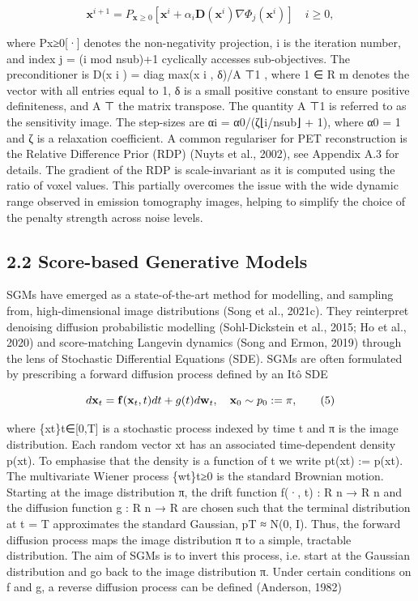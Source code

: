 \documentclass{article}
\begin{document}
$$\mathbf{x}^{i+1}=P_{\mathbf{x}\geq0}\left[\mathbf{x}^{i}+\alpha_{i}\mathbf{D}(\mathbf{x}^{i})\nabla\Phi_{j}(\mathbf{x}^{i})\right]\quad i\geq0,\tag{4}$$

where Px≥0[·] denotes the non-negativity projection, i is the iteration number, and index j = (i mod nsub)+1 cyclically accesses sub-objectives. The preconditioner is D(x i ) = diag max(x i , δ)/A ⊤1 , where 1 ∈ R m denotes the vector with all entries equal to 1, δ is a small positive constant to ensure positive definiteness, and A ⊤ the matrix transpose. The quantity A ⊤1 is referred to as the sensitivity image. The step-sizes are αi = α0/(ζ⌊i/nsub⌋ + 1), where α0 = 1 and ζ is a relaxation coefficient. A common regulariser for PET reconstruction is the Relative Difference Prior (RDP) (Nuyts et al., 2002), see Appendix A.3 for details. The gradient of the RDP is scale-invariant as it is computed using the ratio of voxel values. This partially overcomes the issue with the wide dynamic range observed in emission tomography images, helping to simplify the choice of the penalty strength across noise levels.

\subsection{2.2 Score-based Generative Models}

SGMs have emerged as a state-of-the-art method for modelling, and sampling from, high-dimensional image distributions (Song et al., 2021c). They reinterpret denoising diffusion probabilistic modelling (Sohl-Dickstein et al., 2015; Ho et al., 2020) and score-matching Langevin dynamics (Song and Ermon, 2019) through the lens of Stochastic Differential Equations (SDE). SGMs are often formulated by prescribing a forward diffusion process defined by an Itô SDE

$$d{\bf x}_{t}={\bf f}({\bf x}_{t},t)dt+g(t)d{\bf w}_{t},\quad{\bf x}_{0}\sim p_{0}:=\pi,\tag{5}$$

where \{xt\}t∈[0,T] is a stochastic process indexed by time t and π is the image distribution. Each random vector xt has an associated time-dependent density p(xt). To emphasise that the density is a function of t we write pt(xt) := p(xt). The multivariate Wiener process \{wt\}t≥0 is the standard Brownian motion. Starting at the image distribution π, the drift function f(·, t) : R n → R n and the diffusion function g : R n → R are chosen such that the terminal distribution at t = T approximates the standard Gaussian, pT ≈ N(0, I). Thus, the forward diffusion process maps the image distribution π to a simple, tractable distribution. The aim of SGMs is to invert this process, i.e. start at the Gaussian distribution and go back to the image distribution π. Under certain conditions on f and g, a reverse diffusion process can be defined (Anderson, 1982)
\end{document}
